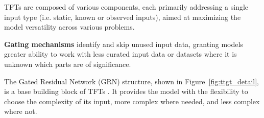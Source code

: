     
    \noindent TFTs are composed of various components, each primarily addressing a single input type (i.e. static, known or observed inputs), aimed at maximizing the model versatility across various problems.
    

    
    \noindent\textbf{Gating mechanisms} identify and skip unused input data, granting models greater ability to work with less curated input data or datasets where it is unknown which parts are of significance.
    
    The Gated Residual Network (GRN) structure, shown in Figure~\ref{fig:ttgt_detail}, is a base building block of TFTs \cite{lim_temporal_2020}. It provides the model with the flexibility to choose the complexity of its input, more complex where needed, and less complex where not.
    


